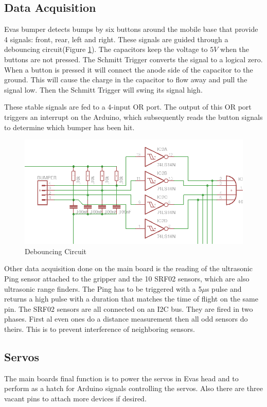 \documentclass[technical_document.tex]{subfiles}
\begin{document}
 
 
 
\subsection{Data Acquisition}
Eva\textquotesingle s bumper detects bumps by six buttons around the mobile base that provide 4 signals: front, rear, left and right. These signals are guided through a debouncing circuit(Figure \ref{fig:DAQ}). The capacitors keep the voltage to $5V$ when the buttons are not pressed. The Schmitt Trigger converts the signal to a logical zero.
When a button is pressed it will connect the anode side of the capacitor to the ground. This will cause the charge in the capacitor to flow away and pull the signal low. Then the Schmitt Trigger will swing its signal high.  

These stable signals are fed to a 4-input OR port. The output of this OR port triggers an interrupt on the Arduino, which subsequently reads the button signals to determine which bumper has been hit. 
 
 \begin{figure}[ht!]
	\centering
	\mbox{\includegraphics[scale=0.5]{Images/DAQ.png}}
	\caption{Debouncing Circuit}
	\label{fig:DAQ}
\end{figure}

Other data acquisition done on the main board is the reading of the ultrasonic Ping sensor attached to the gripper and the 10 SRF02 sensors, which are also ultrasonic range finders.
The Ping has to be triggered with a 5$\mu$s pulse and returns a high pulse with a duration that matches the time of flight on the same pin.
The SRF02 sensors are all connected on an I2C bus. They are fired in two phases. First al even ones do a distance measurement then all odd sensors do theirs. This is to prevent interference of neighboring sensors.

\subsection{Servos}
The main board\textquotesingle s final function is to power the servos in Eva\textquotesingle s head and to perform as a hatch for Arduino signals controlling the servos. Also there are three vacant pins to attach more devices if desired.
\end{document}
